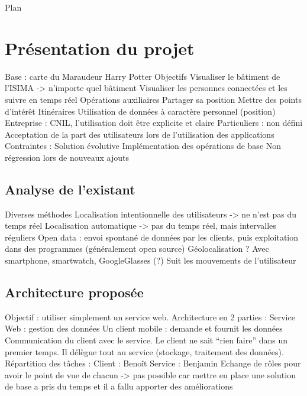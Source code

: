 \documentclass{beamer} %
\begin{document}

  \begin{frame}{Plan}
    \tableofcontents
  \end{frame}


  \section{Présentation du projet}
  \begin{frame}{\secname}
    Base : carte du Maraudeur Harry Potter
    Objectifs
    Visualiser le bâtiment de l’ISIMA -> n’importe quel bâtiment
    Visualiser les personnes connectées et les suivre en temps réel
    Opérations auxiliaires
    Partager sa position
    Mettre des points d’intérêt
    Itinéraires
    Utilisation de données à caractère personnel (position)
    Entreprise : CNIL, l’utilisation doit être explicite et claire
    Particuliers : non défini
    Acceptation de la part des utilisateurs lors de l’utilisation des applications
    Contraintes :
    Solution évolutive
    Implémentation des opérations de base
    Non régression lors de nouveaux ajouts
    
  \end{frame}


\subsection{Analyse de l'existant}
\begin{frame}{\subsecname}
  Diverses méthodes
  Localisation intentionnelle des utilisateurs -> ne n’est pas du temps réel
  Localisation automatique -> pas du temps réel, mais intervalles réguliers
  Open data : envoi spontané de données par les clients, puis exploitation dans des programmes (généralement open source)
  Géolocalisation ?
  Avec smartphone, smartwatch, GoogleGlasses (?)
  Suit les mouvements de l’utilisateur
\end{frame}

\subsection{Architecture proposée}
\begin{frame}{\subsecname}
  Objectif : utiliser simplement un service web.
  Architecture en 2 parties :
  Service Web : gestion des données
  Un client mobile : demande et fournit les données
  Communication du client avec le service. Le client ne sait “rien faire” dans un premier temps. Il délègue tout au service (stockage, traitement des données).
  Répartition des tâches :
  Client : Benoît
  Service : Benjamin
  Echange de rôles pour avoir le point de vue de chacun -> pas possible car mettre en place une solution de base a pris du temps et il a fallu apporter des améliorations
\end{frame}
\end{document}
